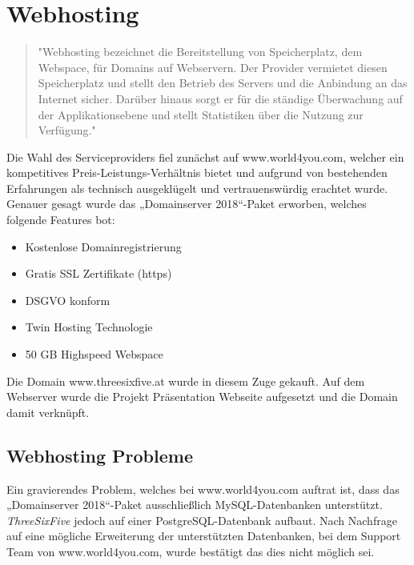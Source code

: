 \section{Webhosting}

\begin{quote} "Webhosting bezeichnet die Bereitstellung von Speicherplatz, dem Webspace, für Domains auf Webservern. Der Provider vermietet diesen Speicherplatz und stellt den Betrieb des Servers und die Anbindung an das Internet sicher. Darüber hinaus sorgt er für die ständige Überwachung auf der Applikationsebene und stellt Statistiken über die Nutzung zur Verfügung."\cite{Webhosting} \end{quote}


Die Wahl des Serviceproviders fiel zunächst auf www.world4you.com, welcher ein kompetitives Preis-Leistungs-Verhältnis bietet und aufgrund von bestehenden Erfahrungen als technisch ausgeklügelt und vertrauenswürdig erachtet wurde. Genauer gesagt wurde das „Domainserver 2018“-Paket erworben, welches folgende Features bot:
\begin{itemize}
\item Kostenlose Domainregistrierung
\item Gratis SSL Zertifikate (https)
\item DSGVO konform
\item Twin Hosting Technologie
\item 50 GB	Highspeed Webspace
\end{itemize}

Die Domain www.threesixfive.at wurde in diesem Zuge gekauft. Auf dem Webserver wurde die Projekt Präsentation Webseite aufgesetzt und die Domain damit verknüpft.

\subsection{Webhosting Probleme}
Ein gravierendes Problem, welches bei www.world4you.com auftrat ist, dass das „Domainserver 2018“-Paket ausschließlich MySQL-Datenbanken unterstützt. \textit{ThreeSixFive} jedoch auf einer PostgreSQL-Datenbank aufbaut. Nach Nachfrage auf eine mögliche Erweiterung der unterstützten Datenbanken, bei dem Support Team von www.world4you.com, wurde bestätigt das dies nicht möglich sei.

